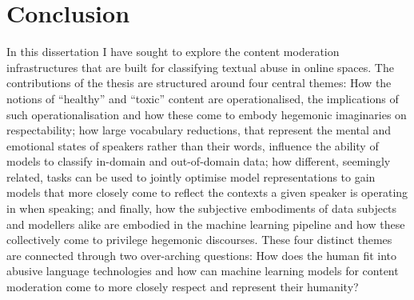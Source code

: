 \ifpdf
    \graphicspath{{Chapter8/Figs/Raster/}{Chapter8/Figs/PDF/}{Chapter8/Figs/}}
\else
    \graphicspath{{Chapter8/Figs/Vector/}{Chapter8/Figs/}}
\fi

\chapter{Conclusion}

In this dissertation I have sought to explore the content moderation infrastructures that are built for classifying textual abuse in online spaces.
The contributions of the thesis are structured around four central themes:
How the notions of ``healthy'' and ``toxic'' content are operationalised, the implications of such operationalisation and how these come to embody hegemonic imaginaries on respectability;
how large vocabulary reductions, that represent the mental and emotional states of speakers rather than their words, influence the ability of models to classify in-domain and out-of-domain data;
how different, seemingly related, tasks can be used to jointly optimise model representations to gain models that more closely come to reflect the contexts a given speaker is operating in when speaking;
and finally, how the subjective embodiments of data subjects and modellers alike are embodied in the machine learning pipeline and how these collectively come to privilege hegemonic discourses.
These four distinct themes are connected through two over-arching questions: How does the human fit into abusive language technologies and how can machine learning models for content moderation come to more closely respect and represent their humanity?

